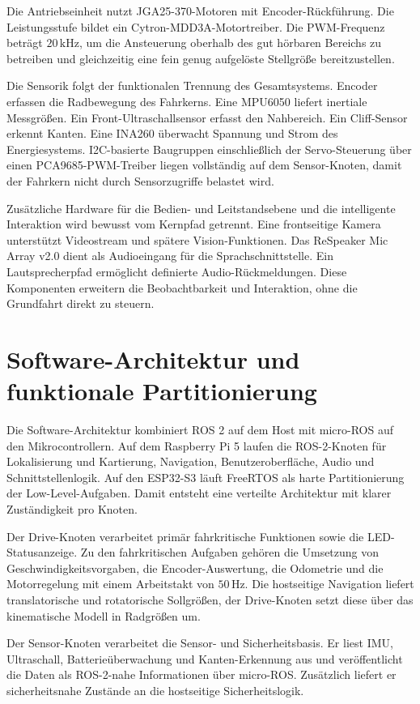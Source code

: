 Die Antriebseinheit nutzt JGA25-370-Motoren mit Encoder-Rückführung. Die Leistungsstufe bildet ein Cytron-MDD3A-Motortreiber. Die PWM-Frequenz beträgt $20\,\mathrm{kHz}$, um die Ansteuerung oberhalb des gut hörbaren Bereichs zu betreiben und gleichzeitig eine fein genug aufgelöste Stellgröße bereitzustellen.

Die Sensorik folgt der funktionalen Trennung des Gesamtsystems. Encoder erfassen die Radbewegung des Fahrkerns. Eine MPU6050 liefert inertiale Messgrößen. Ein Front-Ultraschallsensor erfasst den Nahbereich. Ein Cliff-Sensor erkennt Kanten. Eine INA260 überwacht Spannung und Strom des Energiesystems. I2C-basierte Baugruppen einschließlich der Servo-Steuerung über einen PCA9685-PWM-Treiber liegen vollständig auf dem Sensor-Knoten, damit der Fahrkern nicht durch Sensorzugriffe belastet wird.

Zusätzliche Hardware für die Bedien- und Leitstandsebene und die intelligente Interaktion wird bewusst vom Kernpfad getrennt. Eine frontseitige Kamera unterstützt Videostream und spätere Vision-Funktionen. Das ReSpeaker Mic Array v2.0 dient als Audioeingang für die Sprachschnittstelle. Ein Lautsprecherpfad ermöglicht definierte Audio-Rückmeldungen. Diese Komponenten erweitern die Beobachtbarkeit und Interaktion, ohne die Grundfahrt direkt zu steuern.

\section{Software-Architektur und funktionale Partitionierung}

Die Software-Architektur kombiniert ROS 2 auf dem Host mit micro-ROS auf den Mikrocontrollern. Auf dem Raspberry Pi 5 laufen die ROS-2-Knoten für Lokalisierung und Kartierung, Navigation, Benutzeroberfläche, Audio und Schnittstellenlogik. Auf den ESP32-S3 läuft FreeRTOS als harte Partitionierung der Low-Level-Aufgaben. Damit entsteht eine verteilte Architektur mit klarer Zuständigkeit pro Knoten.

Der Drive-Knoten verarbeitet primär fahrkritische Funktionen sowie die LED-Statusanzeige. Zu den fahrkritischen Aufgaben gehören die Umsetzung von Geschwindigkeitsvorgaben, die Encoder-Auswertung, die Odometrie und die Motorregelung mit einem Arbeitstakt von $50\,\mathrm{Hz}$. Die hostseitige Navigation liefert translatorische und rotatorische Sollgrößen, der Drive-Knoten setzt diese über das kinematische Modell in Radgrößen um.

Der Sensor-Knoten verarbeitet die Sensor- und Sicherheitsbasis. Er liest IMU, Ultraschall, Batterieüberwachung und Kanten-Erkennung aus und veröffentlicht die Daten als ROS-2-nahe Informationen über micro-ROS. Zusätzlich liefert er sicherheitsnahe Zustände an die hostseitige Sicherheitslogik.

